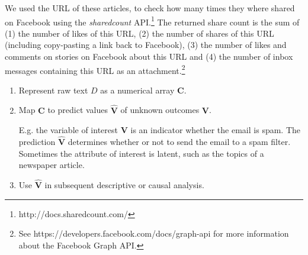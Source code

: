 \documentclass[12pt,a4paper,notitlepage]{article}
\begin{document}
We used the URL of these articles, to check how many times they where shared on Facebook using the \textit{sharedcount} API.\footnote{http://docs.sharedcount.com/} The returned share count is the sum of (1) the number of likes of this URL, (2) the number of shares of this URL (including copy-pasting a link back to Facebook), (3) the number of likes and comments on stories on Facebook about this URL and (4) the number of inbox messages containing this URL as an attachment.\footnote{See https://developers.facebook.com/docs/graph-api for more information about the Facebook Graph API.}

\begin{enumerate}
	\item Represent raw text $D$ as a numerical array $\boldsymbol{C}$. 
	 
	\item Map $\boldsymbol{C}$ to predict values $\boldsymbol{\hat{V}}$ of unknown outcomes $\boldsymbol{V}$. 
	
	E.g. the variable of interest $\boldsymbol{V}$ is an indicator whether the email is spam. The prediction $\boldsymbol{\hat{V}}$ determines whether or not to send the email to a spam filter. Sometimes the attribute of interest is latent, such as the topics of a newspaper article.
	\item Use $\boldsymbol{\hat{V}}$ in subsequent descriptive or causal analysis.
\end{enumerate}
\end{document}
